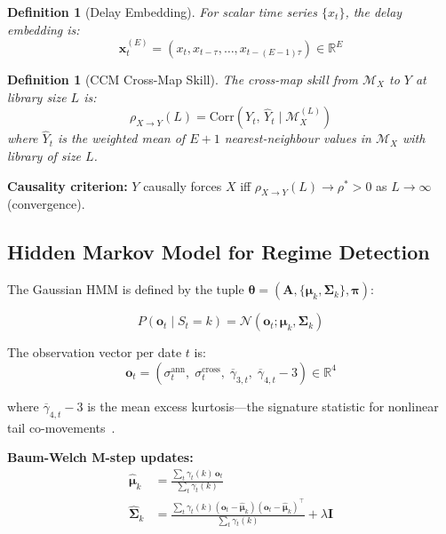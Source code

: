 \documentclass[12pt,a4paper]{article}
\newtheorem{definition}[theorem]{Definition}
\newcommand{\R}{\mathbb{R}}
\newcommand{\bm}[1]{\boldsymbol{#1}}
\begin{document}
\begin{definition}[Delay Embedding]
For scalar time series $\{x_t\}$, the delay embedding is:
\begin{equation}
    \bm{x}_t^{(E)} = (x_t, x_{t-\tau}, \ldots, x_{t-(E-1)\tau}) \in \R^E
\end{equation}
\end{definition}

\begin{definition}[CCM Cross-Map Skill]
The cross-map skill from $\mathcal{M}_X$ to $Y$ at library size $L$ is:
\begin{equation}
    \rho_{X \to Y}(L) = \mathrm{Corr}\!\left(Y_t,\, \hat{Y}_t \mid \mathcal{M}_X^{(L)}\right)
\end{equation}
where $\hat{Y}_t$ is the weighted mean of $E+1$ nearest-neighbour values in
$\mathcal{M}_X$ with library of size $L$.
\end{definition}

\textbf{Causality criterion:} $Y$ causally forces $X$ iff $\rho_{X \to Y}(L) \to \rho^* > 0$
as $L \to \infty$ (convergence).

\subsection{Hidden Markov Model for Regime Detection}

The Gaussian HMM is defined by the tuple $\boldsymbol{\theta} = (\bm{A}, \{\bm{\mu}_k, \bm{\Sigma}_k\}, \bm{\pi})$:

\begin{equation}
    P(\bm{o}_t \mid S_t = k) = \mathcal{N}(\bm{o}_t; \bm{\mu}_k, \bm{\Sigma}_k)
\end{equation}

The observation vector per date $t$ is:
\begin{equation}
    \bm{o}_t = \left(\sigma_t^{\text{ann}},\; \sigma^{\text{cross}}_t,\;
    \overline{\gamma}_{3,t},\; \overline{\gamma}_{4,t} - 3\right)
    \in \R^4
\end{equation}

where $\overline{\gamma}_{4,t} - 3$ is the mean excess kurtosis—the signature
statistic for nonlinear tail co-movements~\citep{ma2023}.

\textbf{Baum-Welch M-step updates:}
\begin{align}
    \hat{\bm{\mu}}_k &= \frac{\sum_t \gamma_t(k)\, \bm{o}_t}{\sum_t \gamma_t(k)} \\
    \hat{\bm{\Sigma}}_k &= \frac{\sum_t \gamma_t(k)(\bm{o}_t - \hat{\bm{\mu}}_k)(\bm{o}_t - \hat{\bm{\mu}}_k)^\top}{\sum_t \gamma_t(k)} + \lambda \bm{I}
\end{align}
\end{document}
